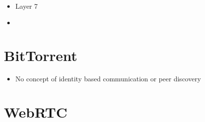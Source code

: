 \begin{itemize}
\tightlist
\item
  Layer 7
\item
\end{itemize}

\hypertarget{bittorrent}{%
\section{BitTorrent}\label{bittorrent}}

\begin{itemize}
\tightlist
\item
  No concept of identity based communication or peer discovery
\end{itemize}

\hypertarget{webrtc}{%
\section{WebRTC}\label{webrtc}}


